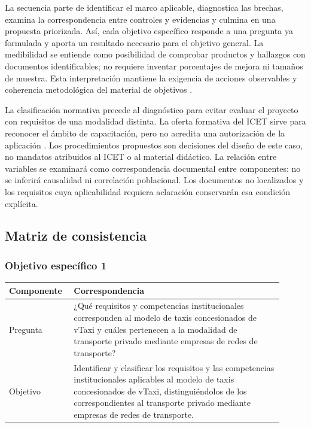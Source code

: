{La secuencia parte de identificar el marco aplicable, diagnostica las brechas, examina la correspondencia entre controles y evidencias y culmina en una propuesta priorizada. Así, cada objetivo específico responde a una pregunta ya formulada y aporta un resultado necesario para el objetivo general. La medibilidad se entiende como posibilidad de comprobar productos y hallazgos con documentos identificables; no requiere inventar porcentajes de mejora ni tamaños de muestra. Esta interpretación mantiene la exigencia de acciones observables y coherencia metodológica del material de objetivos .

\par La clasificación normativa precede al diagnóstico para evitar evaluar el proyecto con requisitos de una modalidad distinta. La oferta formativa del ICET sirve para reconocer el ámbito de capacitación, pero no acredita una autorización de la aplicación . Los procedimientos propuestos son decisiones del diseño de este caso, no mandatos atribuidos al ICET o al material didáctico. La relación entre variables se examinará como correspondencia documental entre componentes: no se inferirá causalidad ni correlación poblacional. Los documentos no localizados y los requisitos cuya aplicabilidad requiera aclaración conservarán esa condición explícita.

\subsection{Matriz de consistencia}

\subsubsection{Objetivo específico 1}

\begin{longtable}{p{0.19\linewidth}p{0.72\linewidth}}

\textbf{Componente} & \textbf{Correspondencia} \\ \hline\endhead

Pregunta & ¿Qué requisitos y competencias institucionales corresponden al modelo de taxis concesionados de vTaxi y cuáles pertenecen a la modalidad de transporte privado mediante empresas de redes de transporte? \\ \hline

Objetivo & Identificar y clasificar los requisitos y las competencias institucionales aplicables al modelo de taxis concesionados de vTaxi, distinguiéndolos de los correspondientes al transporte privado mediante empresas de redes de transporte. \\ \hline


\end{longtable}}
